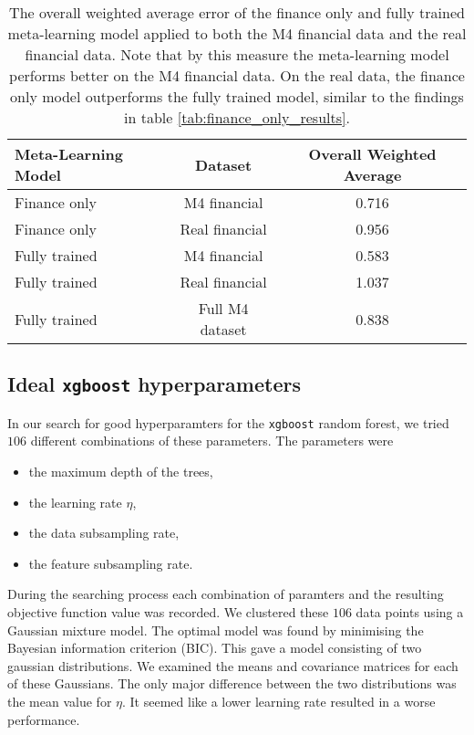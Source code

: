 \documentclass[a4paper,12pt]{article}
\theoremstyle{definition}
\begin{document}
\begin{table}
  \centering
  \begin{tabular}{| l | c | c |}
    \hline
    \textbf{Meta-Learning Model} & \textbf{Dataset} & \textbf{Overall Weighted Average} \\ \hline
    Finance only & M4 financial & 0.716 \\ \hline
    Finance only & Real financial & 0.956 \\ \hline
    Fully trained & M4 financial & 0.583 \\ \hline
    Fully trained & Real financial & 1.037 \\ \hline
    Fully trained & Full M4 dataset & 0.838\cite{res} \\ \hline
  \end{tabular}
  \caption{The overall weighted average error of the finance only and fully trained meta-learning model applied to both the M4 financial data and the real financial data. Note that by this measure the meta-learning model performs better on the M4 financial data. On the real data, the finance only model outperforms the fully trained model, similar to the findings in table \ref{tab:finance_only_results}.}
  \label{tab:meta_learning_errors}
\end{table}

\subsection{Ideal \texttt{xgboost} hyperparameters}
In our search for good hyperparamters for the \texttt{xgboost} random forest, we tried $106$ different combinations of these parameters. The parameters were 
\begin{itemize}
	\item the maximum depth of the trees,
	\item the learning rate $\eta$,
	\item the data subsampling rate,
	\item the feature subsampling rate.
\end{itemize}
During the searching process each combination of paramters and the resulting objective function value was recorded. We clustered these $106$ data points using a Gaussian mixture model. The optimal model was found by minimising the Bayesian information criterion (BIC). This gave a model consisting of two gaussian distributions. We examined the means and covariance matrices for each of these Gaussians. The only major difference between the two distributions was the mean value for $\eta$. It seemed like a lower learning rate resulted in a worse performance.
\end{document}
